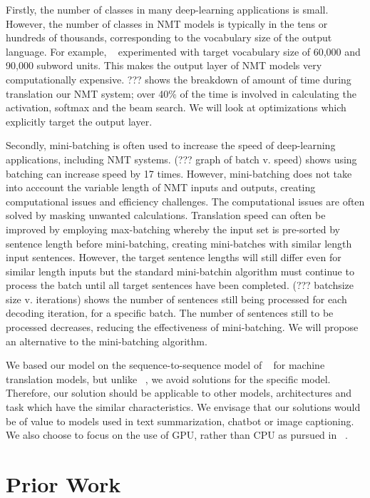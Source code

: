 \documentclass[]{article}
\begin{document}
Firstly, the number of classes in many deep-learning applications is small. However, the number of classes in NMT models is typically in the tens or hundreds of thousands, corresponding to the vocabulary size of the output language. For example, ~\cite{sennrich-haddow-birch:2016:P16-12} experimented with target vocabulary size of 60,000 and 90,000 subword units. This makes the output layer of NMT models very computationally expensive. ??? shows the breakdown of amount of time during translation our NMT system; over 40\% of the time is involved in calculating the activation, softmax and the beam search. We will look at optimizations which explicitly target the output layer.

Secondly, mini-batching is often used to increase the speed of deep-learning applications, including NMT systems. (??? graph of batch v. speed) shows using batching can increase speed by 17 times. However, mini-batching does not take into acccount the variable length of NMT inputs and outputs, creating computational issues and efficiency challenges. The computational issues are often solved by masking unwanted calculations. Translation speed can often be improved by employing max-batching whereby the input set is pre-sorted by sentence length before mini-batching, creating mini-batches with similar length input sentences. However, the target sentence lengths will still differ even for similar length inputs but the standard mini-batchin algorithm must continue to process the batch until all target sentences have been completed. (??? batchsize size v. iterations) shows the number of sentences still being processed for each decoding iteration, for a specific batch. The number of sentences still to be processed decreases, reducing the effectiveness of mini-batching. We will propose an alternative to the mini-batching algorithm.

We based our model on the sequence-to-sequence model of ~\cite{D14-1179} for machine translation models, but unlike ~\cite{DBLP:conf/emnlp/Devlin17}, we avoid solutions for the specific model. Therefore, our solution should be applicable to other models, architectures and task which have the similar characteristics. We envisage that our solutions would be of value to models used in text summarization, chatbot or image captioning. We also choose to focus on the use of GPU, rather than CPU as pursued in ~\cite{DBLP:conf/emnlp/Devlin17}.

\section{Prior Work}
\end{document}

